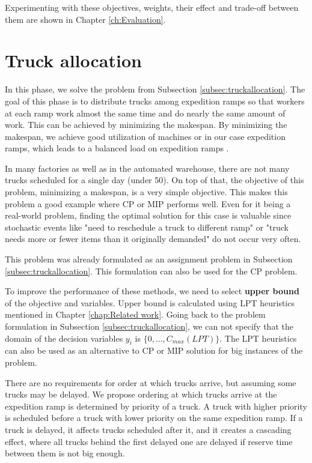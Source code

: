 \documentclass{ctuthesis}
\begin{document}
 Experimenting with these objectives, weights, their effect and trade-off between them are shown in Chapter \ref{ch:Evaluation}.


\section{Truck allocation}
\label{sec:truckallocationprop}
In this phase, we solve the problem from Subsection \ref{subsec:truckallocation}. The goal of this phase is to distribute trucks among expedition ramps so that workers at each ramp work almost the same time and do nearly the same amount of work. This can be achieved by minimizing the makespan. By minimizing the makespan, we achieve good utilization of machines or in our case expedition ramps, which leads to a balanced load on expedition ramps \cite{pinedo}. 

In many factories as well as in the automated warehouse, there are not many trucks scheduled for a single day (under 50). On top of that, the objective of this problem, minimizing a makespan, is a very simple objective. This makes this problem a good example where CP or MIP performs well. Even for it being a real-world problem, finding the optimal solution for this case is valuable since stochastic events like "need to reschedule a truck to different ramp" or "truck needs more or fewer items than it originally demanded" do not occur very often.

This problem was already formulated as an assignment problem in Subsection \ref{subsec:truckallocation}. This formulation can also be used for the CP problem.

To improve the performance of these methods, we need to select \textbf{upper bound} of the objective and variables. Upper bound is calculated using LPT heuristics mentioned in Chapter \ref{chap:Related work}. Going back to the problem formulation in Subsection \ref{subsec:truckallocation}, we can not specify that the domain of the decision variables $y_i$ is $\{0, \ldots, C_{max}(LPT)\}$. The LPT heuristics can also be used as an alternative to CP or MIP solution for big instances of the problem.

There are no requirements for order at which trucks arrive, but assuming some trucks may be delayed. We propose ordering at which trucks arrive at the expedition ramp is determined by priority of a truck. A truck with higher priority is scheduled before a truck with lower priority on the same expedition ramp. If a truck is delayed, it affects trucks scheduled after it, and it creates a cascading effect, where all trucks behind the first delayed one are delayed if reserve time between them is not big enough.
\end{document}

